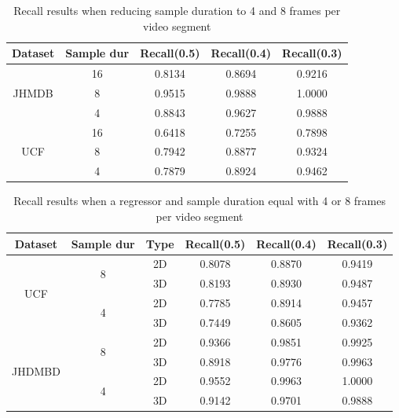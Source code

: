 \en
\begin{table}[h]
  \centering
  \begin{tabular}{|c | c || c c c|}
    \hline
    \textbf{Dataset} & \textbf{Sample dur} & \textbf{Recall(0.5)} &  \textbf{Recall(0.4)} &  \textbf{Recall(0.3)} \\
    \hline
    \multirow{3}{*}{JHMDB} & 16 & 0.8134 & 0.8694 & 0.9216 \\
    \cline{2-5}
    {} & 8 & 0.9515 & 0.9888 & 1.0000 \\
    \cline{2-5}
    {} & 4 & 0.8843 & 0.9627 & 0.9888 \\
    \hline
    \multirow{3}{*}{UCF} & 16 & 0.6418 & 0.7255 & 0.7898 \\
    \cline{2-5}
    {} & 8 & 0.7942 & 0.8877 & 0.9324\\
    \cline{2-5}
    {} & 4 & 0.7879 & 0.8924 & 0.9462 \\
    \hline
    
  \end{tabular}
  \caption{\en Recall results when reducing sample duration to 4 and 8 frames per video segment}
  \label{table:gr_new_sample}
\end{table}
\gr
\en
\begin{table}[h]
  \centering
  \begin{tabular}{|c | c | c || c c c|}

    \hline
    \textbf{Dataset} & \textbf{Sample dur} & \textbf{Type} & \textbf{Recall(0.5)} &  \textbf{Recall(0.4)} &  \textbf{Recall(0.3)} \\
    \hline
    \multirow{4}{*}{UCF} & \multirow{2}{*}{8} & 2D & 0.8078 & 0.8870 & 0.9419 \\
    \cline{3-6}
    {} & {} & 3D & 0.8193 & 0.8930 & 0.9487 \\
    \cline{2-6}
    {} & \multirow{2}{*}{4}& 2D & 0.7785 & 0.8914 & 0.9457 \\
    \cline{3-6}
    {} & {} & 3D & 0.7449 & 0.8605 & 0.9362 \\
    \hline
    \multirow{4}{*}{JHDMBD} & \multirow{2}{*}{8} & 2D &  0.9366 & 0.9851 & 0.9925  \\
    \cline{3-6}
    {} & {} & 3D & 0.8918 & 0.9776 & 0.9963  \\ 
    \cline{2-6}
    {} & \multirow{2}{*}{4}& 2D & 0.9552 & 0.9963 & 1.0000 \\
    \cline{3-6}
    {} & {} & 3D & 0.9142 & 0.9701 & 0.9888  \\
    \hline
    
  \end{tabular}
  \caption{\en Recall results when a regressor and sample duration equal with 4 or 8 frames per video segment}
  \label{table:gr_new_sample_reg}

\end{table}
\gr


